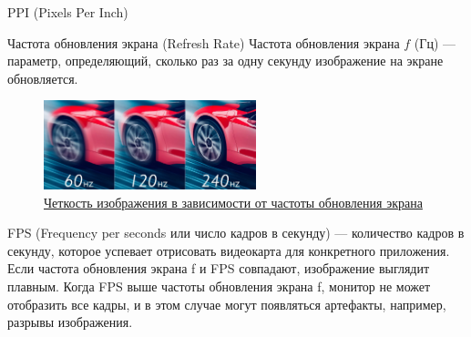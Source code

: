 \documentclass{beamer}
\begin{document}
\begin{frame}{PPI (Pixels Per Inch)}
{			%
	
		}
		
	\end{frame}

	\begin{frame}{Частота обновления экрана (Refresh Rate)}
		Частота обновления экрана $f$ (Гц) --- параметр, определяющий, сколько раз за одну секунду изображение на экране обновляется.

		\begin{figure}
			\includegraphics[width=0.55\textwidth]{images/refresh-rate.png}
			\caption {\href{https://www.benq.com/ru-ru/knowledge-center/knowledge/gaming-projector-high-refresh-rates.html}{Четкость изображения в зависимости от частоты обновления экрана}}
		\end{figure}


		\footnotesize
		FPS (Frequency per seconds или число кадров в секунду) --- количество кадров в секунду, которое успевает отрисовать видеокарта для конкретного приложения. 
		Если частота обновления экрана f и FPS совпадают, изображение выглядит плавным. 
		Когда FPS выше частоты обновления экрана f, монитор не может отобразить все кадры, и в этом случае могут появляться артефакты, например, разрывы изображения.
		
\end{frame}
\end{document}
